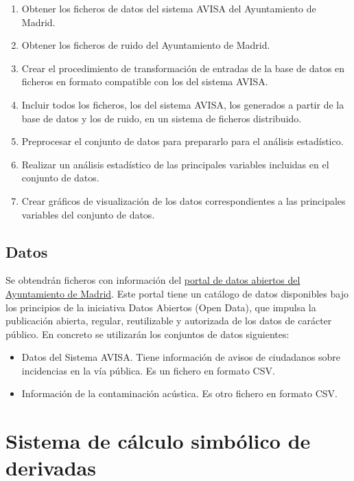 \documentclass[
  a4paper,
]{scrreport}
\providecommand{\tightlist}{%
  \setlength{\itemsep}{0pt}\setlength{\parskip}{0pt}}\usepackage{longtable,booktabs,array}
\begin{document}
\begin{enumerate}
\def\labelenumi{\arabic{enumi}.}
\tightlist
\item
  Obtener los ficheros de datos del sistema AVISA del Ayuntamiento de
  Madrid.
\item
  Obtener los ficheros de ruido del Ayuntamiento de Madrid.
\item
  Crear el procedimiento de transformación de entradas de la base de
  datos en ficheros en formato compatible con los del sistema AVISA.
\item
  Incluir todos los ficheros, los del sistema AVISA, los generados a
  partir de la base de datos y los de ruido, en un sistema de ficheros
  distribuido.
\item
  Preprocesar el conjunto de datos para prepararlo para el análisis
  estadístico.
\item
  Realizar un análisis estadístico de las principales variables
  incluidas en el conjunto de datos.
\item
  Crear gráficos de visualización de los datos correspondientes a las
  principales variables del conjunto de datos.
\end{enumerate}

\hypertarget{datos-2}{%
\section{Datos}\label{datos-2}}

Se obtendrán ficheros con información del
\href{http://datos.madrid.es/portal/site/egob}{portal de datos abiertos
del Ayuntamiento de Madrid}. Este portal tiene un catálogo de datos
disponibles bajo los principios de la iniciativa Datos Abiertos (Open
Data), que impulsa la publicación abierta, regular, reutilizable y
autorizada de los datos de carácter público. En concreto se utilizarán
los conjuntos de datos siguientes:

\begin{itemize}
\tightlist
\item
  Datos del Sistema AVISA. Tiene información de avisos de ciudadanos
  sobre incidencias en la vía pública. Es un fichero en formato CSV.
\item
  Información de la contaminación acústica. Es otro fichero en formato
  CSV.
\end{itemize}


\hypertarget{sistema-de-cuxe1lculo-simbuxf3lico-de-derivadas}{%
\chapter{Sistema de cálculo simbólico de
derivadas}\label{sistema-de-cuxe1lculo-simbuxf3lico-de-derivadas}}
\end{document}
